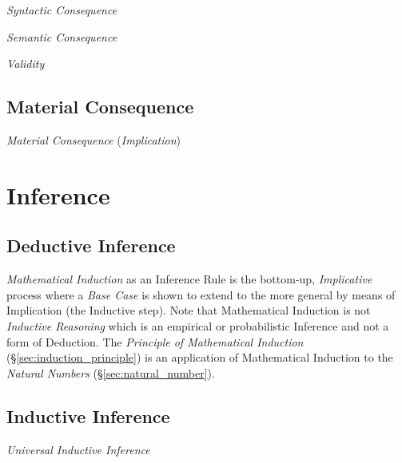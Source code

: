 \emph{Syntactic Consequence}

\emph{Semantic Consequence}

\emph{Validity}



\subsection{Material Consequence}\label{sec:material_consequence}

\emph{Material Consequence} (\emph{Implication})



\section{Inference}\label{sec:mathematical_inference}

\subsection{Deductive Inference}

\emph{Mathematical Induction} as an Inference Rule is the bottom-up,
\emph{Implicative} process where a \emph{Base Case} is shown to extend
to the more general by means of Implication (the Inductive step). Note
that Mathematical Induction is not \emph{Inductive Reasoning} which is
an empirical or probabilistic Inference and not a form of Deduction.
The \emph{Principle of Mathematical Induction}
(\S\ref{sec:induction_principle}) is an application of Mathematical
Induction to the \emph{Natural Numbers} (\S\ref{sec:natural_number}).



\subsection{Inductive Inference}

\emph{Universal Inductive Inference}




